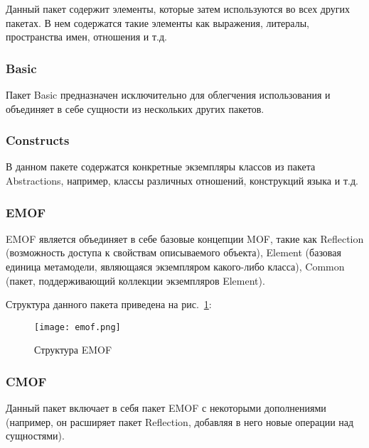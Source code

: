 Данный пакет содержит элементы, которые затем используются во всех других
пакетах. В нем содержатся такие элементы как выражения, литералы,
пространства имен, отношения и т.д.

\subsubsection{Basic}

Пакет Basic предназначен исключительно для облегчения использования и объединяет
в себе сущности из нескольких других пакетов.

\subsubsection{Constructs}

В данном пакете содержатся конкретные экземпляры классов из пакета Abstractions,
например, классы различных отношений, конструкций языка и т.д.

\subsubsection{EMOF}


EMOF является объединяет в себе базовые концепции MOF, такие как Reflection
(возможность доступа к свойствам описываемого объекта), Element (базовая единица
метамодели, являющаяся экземпляром какого-либо класса), Common (пакет,
поддерживающий коллекции экземпляров Element).

Структура данного пакета приведена на рис.~\ref{fig:emof}:

\begin{figure}[ht]
    \begin{center}
        \texttt{[image: emof.png]}
    \end{center}
    \caption{Структура EMOF}
    \label{fig:emof}
\end{figure}

\subsubsection{CMOF}


Данный пакет включает в себя пакет EMOF с некоторыми дополнениями  (например, он
расширяет пакет Reflection, добавляя в него новые операции над сущностями).

